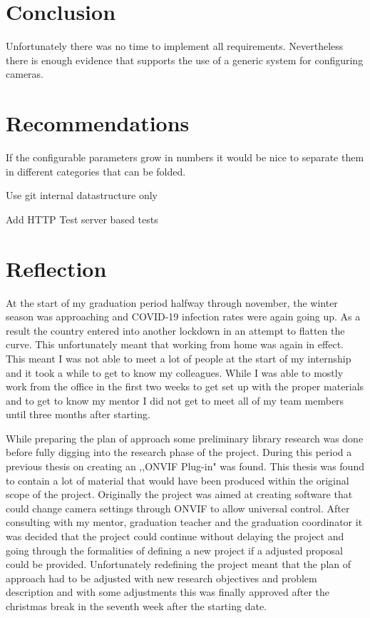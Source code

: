 \chapter{Conclusion}
Unfortunately there was no time to implement all requirements.
Nevertheless there is enough evidence that supports the use of a generic system for configuring cameras.


\chapter{Recommendations}
If the configurable parameters grow in numbers it would be nice to separate them in different categories that can be folded.

Use git internal datastructure only

Add HTTP Test server based tests

\chapter{Reflection}
At the start of my graduation period halfway through november, the winter season was approaching and COVID-19 infection rates were again going up.
As a result the country entered into another lockdown in an attempt to flatten the curve.
This unfortunately meant that working from home was again in effect.
This meant I was not able to meet a lot of people at the start of my internship and it took a while to get to know my colleagues.
While I was able to mostly work from the office in the first two weeks to get set up with the proper materials and to get to know my mentor I did not get to meet all of my team members until three months after starting.

While preparing the plan of approach some preliminary library research was done before fully digging into the research phase of the project.
During this period a previous thesis on creating an ,,ONVIF Plug-in" \cite{kesteloo_onvif_2016} was found.
This thesis was found to contain a lot of material that would have been produced within the original scope of the project.
Originally the project was aimed at creating software that could change camera settings through ONVIF to allow universal control.
After consulting with my mentor, graduation teacher and the graduation coordinator it was decided that the project could continue without delaying the project and going through the formalities of defining a new project if a adjusted proposal could be provided.
Unfortunately redefining the project meant that the plan of approach had to be adjusted with new research objectives and problem description and with some adjustments this was finally approved after the christmas break in the seventh week after the starting date.


